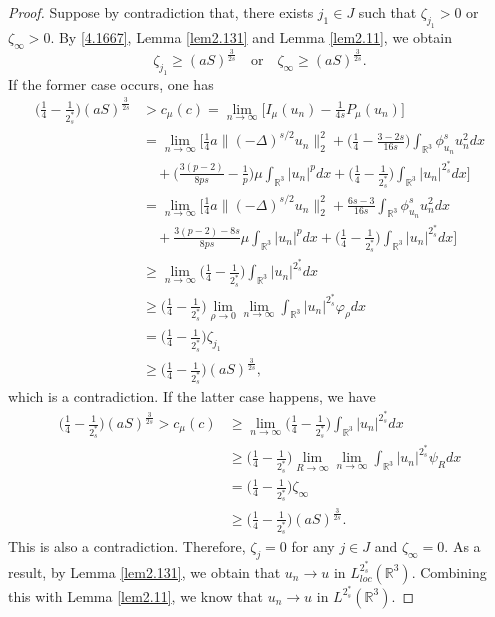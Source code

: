 \documentclass[11pt]{article}
\numberwithin{equation}{section}
\begin{document}
\begin{proof}
 Suppose by contradiction that, there exists $j_1\in J$ such that $\zeta_{j_1}>0$ 
or $\zeta_\infty>0$.  By  \eqref{4.1667}, Lemma {\ref{lem2.131}} and  
Lemma  \ref{lem2.11}, we obtain
$$
\zeta_{j_1}\geq (aS)^{\frac{3}{2s}} \quad\text{or}\quad
\zeta_{\infty}\geq (aS)^{\frac{3}{2s}}.
$$
If the former case occurs, one has
\begin{align*}
\Big(\frac{1}{4}-\frac{1}{2^*_s}\Big)(aS)^{\frac{3}{2s}}
&>c_\mu(c)
=\lim_{n\to \infty}\Big[I_\mu(u_n)-\frac{1}{4s}P_\mu(u_n)\Big]\\
&=  \lim_{n\to \infty}\big[\frac{1}{4}a\|(-\Delta)^{s/2}u_n\|^2_2
 +\Big(\frac{1}{4}-\frac{3-2s}{16s}\Big)\int_{\mathbb{R}^3}\phi^s_{u_n}u^2_ndx\\
&\quad +\Big(\frac{3(p-2)}{8ps}-\frac{1}{p}\Big)
 \mu \int_{\mathbb{R}^3}|u_n|^pdx
 +\Big(\frac{1}{4}-\frac{1}{2^*_s}\Big)\int_{\mathbb{R}^3}|u_n|^{2^*_s}dx\Big]\\
&=  \lim_{n\to \infty}\Big[\frac{1}{4}a\|(-\Delta)^{s/2}u_n\|^2_2
 +\frac{6s-3}{16s}\int_{\mathbb{R}^3}\phi^s_{u_n}u^2_ndx\\
&\quad +\frac{3(p-2)-8s}{8ps}\mu \int_{\mathbb{R}^3}|u_n|^pdx+\Big(\frac{1}{4}
 -\frac{1}{2^*_s}\Big)\int_{\mathbb{R}^3}|u_n|^{2^*_s}dx\Big]\\
&\geq \lim_{n\to \infty}\Big(\frac{1}{4}-\frac{1}{2^*_s}\Big)
 \int_{\mathbb{R}^3}|u_n|^{2^*_s}dx\\
&\geq \Big(\frac{1}{4}-\frac{1}{2^*_s}\Big)\lim_{\rho\to 0}
 \lim_{n\to \infty}\int_{\mathbb{R}^3}|u_n|^{2^*_s}\varphi_\rho dx\\
&=  \Big(\frac{1}{4}-\frac{1}{2^*_s}\Big)\zeta_{j_1}\\
&\geq\Big(\frac{1}{4}-\frac{1}{2^*_s}\Big) (aS)^{\frac{3}{2s}},
\end{align*}
which is a contradiction. If the latter case happens, we have
\begin{align*}
\Big(\frac{1}{4}-\frac{1}{2^*_s}\Big)(aS)^{\frac{3}{2s}}>c_\mu(c)
&\geq \lim_{n\to \infty}\Big(\frac{1}{4}-\frac{1}{2^*_s}\Big)
 \int_{\mathbb{R}^3}|u_n|^{2^*_s}dx\\
&\geq \Big(\frac{1}{4}-\frac{1}{2^*_s}\Big)\lim_{R\to \infty}
 \lim_{n\to \infty}\int_{\mathbb{R}^3}|u_n|^{2^*_s}\psi_R dx\\
&= \Big(\frac{1}{4}-\frac{1}{2^*_s}\Big)\zeta_\infty \\
&\geq\Big(\frac{1}{4}-\frac{1}{2^*_s}\Big) (aS)^{\frac{3}{2s}}.
\end{align*}
This is also a contradiction. Therefore, $\zeta_j=0$ for any 
$j\in J$ and $\zeta_\infty=0$. As a result, by Lemma \ref{lem2.131}, 
we obtain that $u_n\to u$ in $L^{2^*_s}_{loc}(\mathbb{R}^3)$.
Combining this with   Lemma \ref{lem2.11}, we know that $u_n\to u$ in 
$L^{2^*_s}(\mathbb{R}^3)$.
\smallskip


\end{proof}
\end{document}
